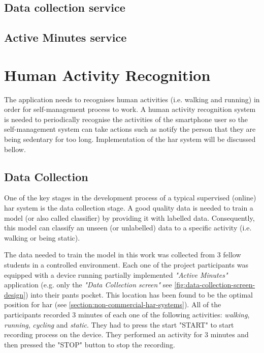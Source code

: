     \subsection{Data collection service}
    
    \subsection{Active Minutes service}
    


\section{Human Activity Recognition}
The application needs to recognises human activities (i.e. walking and running) in order for self-management process to work. A human activity recognition system is needed to periodically recognise the activities of the smartphone user so the self-management system can take actions such as notify the person that they are being sedentary for too long. Implementation of the \gls{har} system will be discussed bellow.

    \subsection{Data Collection}
    One of the key stages in the development process of a typical supervised (online) \gls{har} system is the data collection stage. A good quality data is needed to train a model (or also called classifier) by providing it with labelled data. Consequently, this model can classify an unseen (or unlabelled) data to a specific activity (i.e. walking or being static).
    
    The data needed to train the model in this work was collected from 3 fellow students in a controlled environment. Each one of the project participants was equipped with a device running partially implemented \textit{"Active Minutes"} application (e.g. only the \textit{"Data Collection screen"} see \ref{fig:data-collection-screen-design}) into their pants pocket. This location has been found to be the optimal position for \gls{har} (see \ref{section:non-commercial-har-systems}). All of the participants recorded 3 minutes of each one of the following activities: \textit{walking}, \textit{running}, \textit{cycling} and \textit{static}. They had to press the start "START" to start recording process on the device. They performed an activity for 3 minutes and then pressed the "STOP" button to stop the recording.
    
